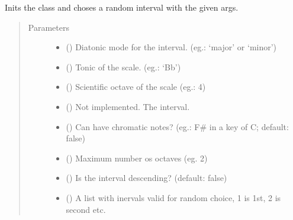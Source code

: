 \documentclass[letterpaper,10pt,english]{sphinxmanual}
\begin{document}
\begin{fulllineitems}
\begin{fulllineitems}
\label{\detokenize{birdears:birdears.interval.ChromaticInterval.__init__}}
Inits the class and choses a random interval with the given args.
\begin{quote}\begin{description}
\item[{Parameters}] \leavevmode\begin{itemize}
\item {} 
 () \textendash{} Diatonic mode for the interval.
(eg.: ‘major’ or ‘minor’)

\item {} 
 () \textendash{} Tonic of the scale. (eg.: ‘Bb’)

\item {} 
 () \textendash{} Scientific octave of the scale (eg.: 4)

\item {} 
 () \textendash{} Not implemented. The interval.

\item {} 
 () \textendash{} Can have chromatic notes? (eg.: F\# in a key
of C; default: false)

\item {} 
 () \textendash{} Maximum number os octaves (eg. 2)

\item {} 
 () \textendash{} Is the interval descending? (default: false)

\item {} 
 () \textendash{} A list with inervals valid for random
choice, 1 is 1st, 2 is second etc.

\end{itemize}

\end{description}\end{quote}

\end{fulllineitems}


\end{fulllineitems}
\end{document}

